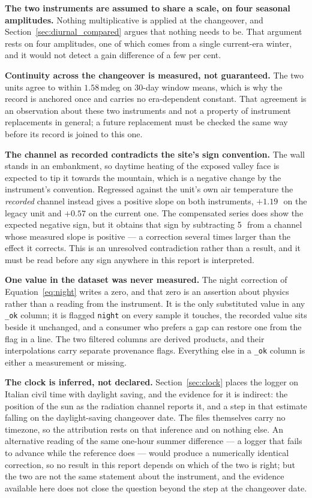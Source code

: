 \documentclass[11pt,a4paper]{article}
\begin{document}
\textbf{The two instruments are assumed to share a scale, on four seasonal amplitudes.} Nothing multiplicative is applied at the changeover, and Section~\ref{sec:diurnal_compared} argues that nothing needs to be. That argument rests on four amplitudes, one of which comes from a single current-era winter, and it would not detect a gain difference of a few per cent.

\textbf{Continuity across the changeover is measured, not guaranteed.} The two units agree to within $1.58$\,mdeg on 30-day window means, which is why the record is anchored once and carries no era-dependent constant. That agreement is an observation about these two instruments and not a property of instrument replacements in general; a future replacement must be checked the same way before its record is joined to this one.

\textbf{The channel as recorded contradicts the site's sign convention.} The wall stands in an embankment, so daytime heating of the exposed valley face is expected to tip it towards the mountain, which is a negative change by the instrument's convention. Regressed against the unit's own air temperature the \emph{recorded} channel instead gives a positive slope on both instruments, $+1.19$\,\mdegC\ on the legacy unit and $+0.57$ on the current one. The compensated series does show the expected negative sign, but it obtains that sign by subtracting 5\,\mdegC\ from a channel whose measured slope is positive --- a correction several times larger than the effect it corrects. This is an unresolved contradiction rather than a result, and it must be read before any sign anywhere in this report is interpreted.

\textbf{One value in the dataset was never measured.} The night correction of Equation~\eqref{eq:night} writes a zero, and that zero is an assertion about physics rather than a reading from the instrument. It is the only substituted value in any \texttt{\_ok} column; it is flagged \texttt{night} on every sample it touches, the recorded value sits beside it unchanged, and a consumer who prefers a gap can restore one from the flag in a line. The two filtered columns are derived products, and their interpolations carry separate provenance flags. Everything else in a \texttt{\_ok} column is either a measurement or missing.

\textbf{The clock is inferred, not declared.} Section~\ref{sec:clock} places the logger on Italian civil time with daylight saving, and the evidence for it is indirect: the position of the sun as the radiation channel reports it, and a step in that estimate falling on the daylight-saving changeover date. The files themselves carry no timezone, so the attribution rests on that inference and on nothing else. An alternative reading of the same one-hour summer difference --- a logger that fails to advance while the reference does --- would produce a numerically identical correction, so no result in this report depends on which of the two is right; but the two are not the same statement about the instrument, and the evidence available here does not close the question beyond the step at the changeover date.
\end{document}
